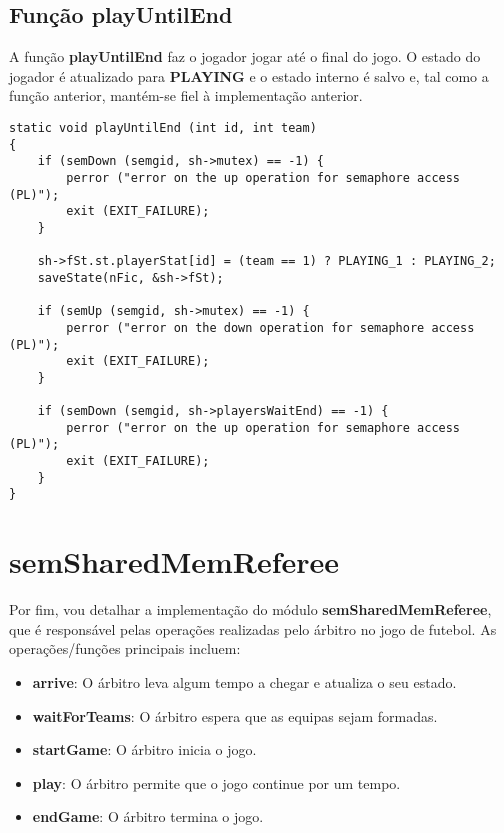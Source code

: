 \documentclass[code,math]{relatorio-deti}
\begin{document}
\section{Função \textbf{playUntilEnd}}

A função \textbf{playUntilEnd} faz o jogador jogar até o final do jogo. O estado do jogador é atualizado para \textbf{PLAYING} e o estado interno é salvo e, tal como a função anterior, mantém-se fiel à implementação anterior.

\begin{verbatim}
static void playUntilEnd (int id, int team)
{
    if (semDown (semgid, sh->mutex) == -1) {                                                     
        perror ("error on the up operation for semaphore access (PL)");
        exit (EXIT_FAILURE);
    }

    sh->fSt.st.playerStat[id] = (team == 1) ? PLAYING_1 : PLAYING_2;
    saveState(nFic, &sh->fSt);

    if (semUp (semgid, sh->mutex) == -1) {                                                         
        perror ("error on the down operation for semaphore access (PL)");
        exit (EXIT_FAILURE);
    }

    if (semDown (semgid, sh->playersWaitEnd) == -1) {                                                     
        perror ("error on the up operation for semaphore access (PL)");
        exit (EXIT_FAILURE);
    }
}
\end{verbatim}

\chapter{semSharedMemReferee}

Por fim, vou detalhar a implementação do módulo \textbf{semSharedMemReferee}, que é responsável pelas operações realizadas pelo árbitro no jogo de futebol. As operações/funções principais incluem:

\begin{itemize}
    \item \textbf{arrive}: O árbitro leva algum tempo a chegar e atualiza o seu estado.
    \item \textbf{waitForTeams}: O árbitro espera que as equipas sejam formadas.
    \item \textbf{startGame}: O árbitro inicia o jogo.
    \item \textbf{play}: O árbitro permite que o jogo continue por um tempo.
    \item \textbf{endGame}: O árbitro termina o jogo.
\end{itemize}
\end{document}
